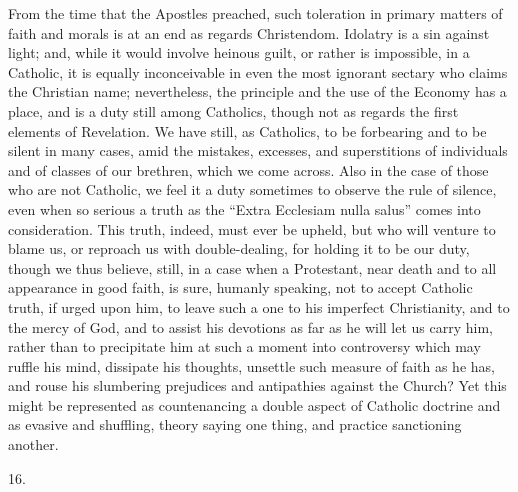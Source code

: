 From the time that the Apostles preached, such toleration in
primary matters of faith and morals is at an end as regards
Christendom. Idolatry is a sin against light; and, while it would
involve heinous guilt, or rather is impossible, in a Catholic, it is
equally inconceivable in even the most ignorant sectary who claims the
Christian name; nevertheless, the principle and the use of the Economy
has a place, and is a duty still among Catholics, though not as
regards the first elements of Revelation. We have still, as Catholics,
to be forbearing and to be silent in many cases, amid the mistakes,
excesses, and superstitions of individuals and of classes of our
brethren, which we come across. Also in the case of those who
are not Catholic, we feel it a duty sometimes to observe the rule of
silence, even when so serious a truth as the ``Extra Ecclesiam
nulla salus'' comes into consideration. This truth, indeed, must
ever be upheld, but who will venture to blame us, or reproach us with
double-dealing, for holding it to be our duty, though we thus believe,
still, in a case when a Protestant, near death and to all appearance
in good faith, is sure, humanly speaking, not to accept Catholic
truth, if urged upon him, to leave such a one to his imperfect
Christianity, and to the mercy of God, and to assist his devotions as
far as he will let us carry him, rather than to precipitate him at
such a moment into controversy which may ruffle his mind, dissipate
his thoughts, unsettle such measure of faith as he has, and rouse his
slumbering prejudices and antipathies against the Church? Yet this
might be represented as countenancing a double aspect of Catholic
doctrine and as evasive and shuffling, theory saying one thing, and
practice sanctioning another.

16.

